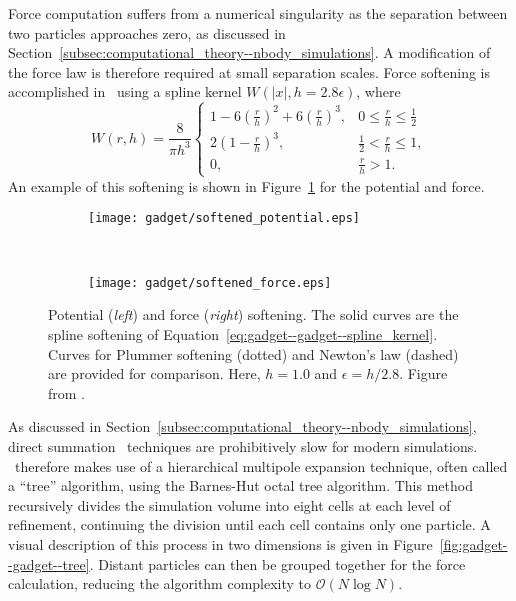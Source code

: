 Force computation suffers from a numerical singularity as the separation between two particles approaches zero, as discussed in Section~\ref{subsec:computational_theory--nbody_simulations}.  A modification of the force law is therefore required at small separation scales.  Force softening is accomplished in \gadgettwo\ using a spline kernel \citep{1985A&A...149..135M} $W(|x|, h = 2.8 \epsilon)$, where
\begin{equation} \label{eq:gadget--gadget--spline_kernel}
	W(r,h) = \frac{8}{\pi h^{3}}
	\begin{cases}
		1 - 6 \left( \frac{r}{h} \right)^{2} + 6 \left( \frac{r}{h} \right)^{3}, & 0 \leq \frac{r}{h} \leq \frac{1}{2} \\
		2 \left( 1 - \frac{r}{h} \right)^{3},                                    & \frac{1}{2} < \frac{r}{h} \leq 1, \\
		0,                                                                       & \frac{r}{h} > 1.
	\end{cases}
\end{equation}
An example of this softening is shown in Figure~\ref{fig:gadget--gadget--softening} for the potential and force.

\begin{figure}[t]
	\centering
	\begin{subfigure}{}
		\texttt{[image: gadget/softened\_potential.eps]}
	\end{subfigure}
	~
	\begin{subfigure}{}
		\texttt{[image: gadget/softened\_force.eps]}
	\end{subfigure}
	\caption[Potential and force softening.]{Potential (\emph{left}) and force (\emph{right}) softening.  The solid curves are the spline softening of Equation~\ref{eq:gadget--gadget--spline_kernel}.  Curves for Plummer softening (dotted) and Newton's law (dashed) are provided for comparison.  Here, $h = 1.0$ and $\epsilon = h/2.8$.  Figure from \citet{2001NewA....6...79S}.}
	\label{fig:gadget--gadget--softening}
\end{figure}

As discussed in Section~\ref{subsec:computational_theory--nbody_simulations}, direct summation \nbody\ techniques are prohibitively slow for modern simulations.  \gadgettwo\ therefore makes use of a hierarchical multipole expansion technique, often called a ``tree'' algorithm, using the Barnes-Hut octal tree \citep{1986Natur.324..446B} algorithm.  This method recursively divides the simulation volume into eight cells at each level of refinement, continuing the division until each cell contains only one particle.  A visual description of this process in two dimensions is given in Figure~\ref{fig:gadget--gadget--tree}.  Distant particles can then be grouped together for the force calculation, reducing the algorithm complexity to $\mathcal{O} (N \log N)$.

